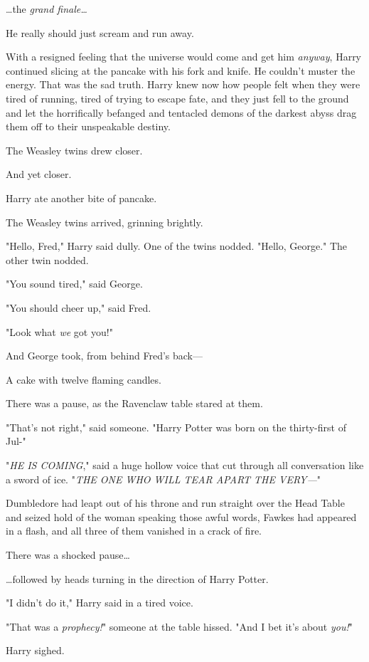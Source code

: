 {\ldots}the \emph{grand finale{\ldots}}

He really should just scream and run away.

With a resigned feeling that the universe would come and get him \emph{anyway}, 
Harry continued slicing at the pancake with his fork and knife. He couldn't 
muster the energy. That was the sad truth. Harry knew now how people felt when 
they were tired of running, tired of trying to escape fate, and they just fell 
to the ground and let the horrifically befanged and tentacled demons of the 
darkest abyss drag them off to their unspeakable destiny.

The Weasley twins drew closer.

And yet closer.

Harry ate another bite of pancake.

The Weasley twins arrived, grinning brightly.

"Hello, Fred," Harry said dully. One of the twins nodded. "Hello, George." The 
other twin nodded.

"You sound tired," said George.

"You should cheer up," said Fred.

"Look what \emph{we} got you!"

And George took, from behind Fred's back---

A cake with twelve flaming candles.

There was a pause, as the Ravenclaw table stared at them.

"That's not right," said someone. "Harry Potter was born on the thirty-first of 
Jul-"

"\emph{HE IS COMING}," said a huge hollow voice that cut through all 
conversation like a sword of ice. "\emph{THE ONE WHO WILL TEAR APART THE 
VERY---}"

Dumbledore had leapt out of his throne and run straight over the Head Table and 
seized hold of the woman speaking those awful words, Fawkes had appeared in a 
flash, and all three of them vanished in a crack of fire.

There was a shocked pause{\ldots}

{\ldots}followed by heads turning in the direction of Harry Potter.

"I didn't do it," Harry said in a tired voice.

"That was a \emph{prophecy!}" someone at the table hissed. "And I bet it's 
about \emph{you!}"

Harry sighed.

